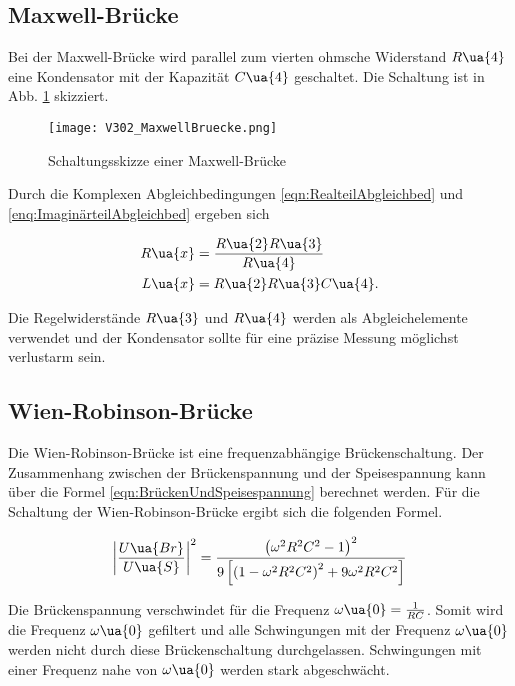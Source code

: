 \subsection{Maxwell-Brücke}

Bei der Maxwell-Brücke wird parallel zum vierten ohmsche Widerstand $R\ua{4}$
eine Kondensator mit der Kapazität $C\ua{4}$ geschaltet. Die Schaltung ist in
Abb. \ref{fig:Maxwell-Brücke} skizziert.

\begin{figure}
  \texttt{[image: V302\_MaxwellBruecke.png]}
  \caption{Schaltungsskizze einer Maxwell-Brücke\cite{anleitung01}}
  \label{fig:Maxwell-Brücke}
\end{figure}

Durch die Komplexen Abgleichbedingungen \eqref{eqn:RealteilAbgleichbed} und
\eqref{enq:ImaginärteilAbgleichbed} ergeben sich

\begin{align}
  R\ua{x} &= \frac{R\ua{2}R\ua{3}}{R\ua{4}}\label{eqn:Maxwell_Rx}\\
  L\ua{x} &= R\ua{2}R\ua{3}C\ua{4}.\label{eqn:Maxwell_Lx}
\end{align}

Die Regelwiderstände $R\ua{3}$ und $R\ua{4}$ werden als Abgleichelemente verwendet
und der Kondensator sollte für eine präzise Messung möglichst verlustarm sein.

\subsection{Wien-Robinson-Brücke}
Die Wien-Robinson-Brücke ist eine frequenzabhängige Brückenschaltung. Der Zusammenhang
zwischen der Brückenspannung und der Speisespannung kann über die Formel
\eqref{eqn:BrückenUndSpeisespannung} berechnet werden. Für die Schaltung der
Wien-Robinson-Brücke ergibt sich die folgenden Formel.

\begin{equation}
  \label{eqn:Wien-Robinson-Brücke}
  \left|\frac{U\ua{Br}}{U\ua{S}}\right|^2 = \frac{\left(\omega^2R^2C^2 - 1\right)^2}{
  9\left[\left(1 - \omega^2R^2C^2\right)^2 + 9\omega^2R^2C^2\right]}
\end{equation}

Die Brückenspannung verschwindet für die Frequenz $\omega\ua{0} = \frac{1}{RC}$.
Somit wird die Frequenz $\omega\ua{0}$ gefiltert und alle Schwingungen mit
der Frequenz $\omega\ua{0}$ werden nicht durch diese Brückenschaltung durchgelassen.
Schwingungen mit einer Frequenz nahe von $\omega\ua{0}$ werden stark abgeschwächt.

